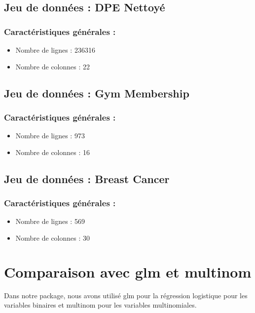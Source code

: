 \documentclass[10pt,french]{report}
\begin{document}
    \subsection{Jeu de données : DPE Nettoyé}
    
    \subsubsection{Caractéristiques générales :}
    \begin{itemize}
        \item Nombre de lignes : 236316
        \item Nombre de colonnes : 22
    \end{itemize}

    \subsection{Jeu de données : Gym Membership}
    
    \subsubsection{Caractéristiques générales :}
    \begin{itemize}
        \item Nombre de lignes : 973
        \item Nombre de colonnes : 16
    \end{itemize}

    \subsection{Jeu de données : Breast Cancer}
    
    \subsubsection{Caractéristiques générales :}
    \begin{itemize}
        \item Nombre de lignes : 569
        \item Nombre de colonnes : 30
    \end{itemize}

    \section{Comparaison avec glm et multinom}

    Dans notre package, nous avons utilisé glm pour la régression logistique pour les variables binaires et multinom pour les variables multinomiales.
\end{document}
